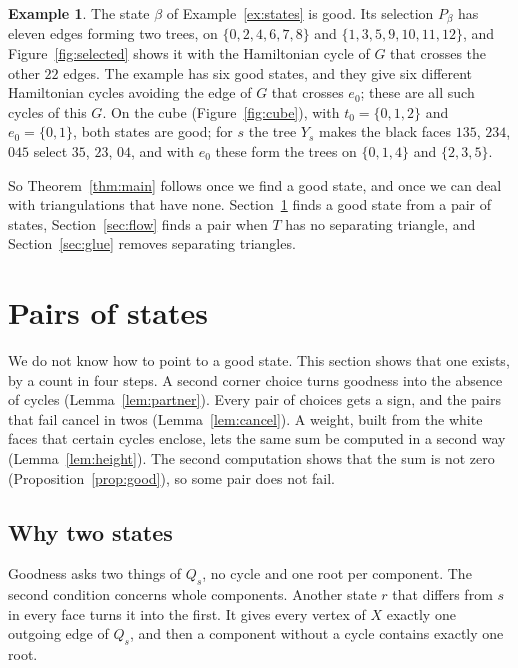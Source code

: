 \documentclass[10pt]{amsart}
\numberwithin{equation}{section}
\theoremstyle{definition}
\newtheorem{example}[equation]{Example}
\theoremstyle{remark}
\newcommand{\T}{T}
\begin{document}
\begin{example}\label{ex:recover}
The state $\beta$ of Example~\ref{ex:states} is good.
Its selection $P_\beta$ has eleven edges forming two trees, on $\{0,2,4,6,7,8\}$ and $\{1,3,5,9,10,11,12\}$, and Figure~\ref{fig:selected} shows it with the Hamiltonian cycle of $G$ that crosses the other $22$ edges.
The example has six good states, and they give six different Hamiltonian cycles avoiding the edge of $G$ that crosses $e_0$; these are all such cycles of this $G$.
On the cube (Figure~\ref{fig:cube}), with $t_0=\{0,1,2\}$ and $e_0=\{0,1\}$, both states are good; for $s$ the tree $Y_s$ makes the black faces $135$, $234$, $045$ select $35$, $23$, $04$, and with $e_0$ these form the trees on $\{0,1,4\}$ and $\{2,3,5\}$.
\end{example}

So Theorem~\ref{thm:main} follows once we find a good state, and once we can deal with triangulations that have none.
Section~\ref{sec:pairs} finds a good state from a pair of states, Section~\ref{sec:flow} finds a pair when $\T$ has no separating triangle, and Section~\ref{sec:glue} removes separating triangles.

\FloatBarrier
\section{Pairs of states}\label{sec:pairs}

We do not know how to point to a good state.
This section shows that one exists, by a count in four steps.
A second corner choice turns goodness into the absence of cycles (Lemma~\ref{lem:partner}).
Every pair of choices gets a sign, and the pairs that fail cancel in twos (Lemma~\ref{lem:cancel}).
A weight, built from the white faces that certain cycles enclose, lets the same sum be computed in a second way (Lemma~\ref{lem:height}).
The second computation shows that the sum is not zero (Proposition~\ref{prop:good}), so some pair does not fail.

\subsection*{Why two states}
Goodness asks two things of $Q_s$, no cycle and one root per component.
The second condition concerns whole components.
Another state $r$ that differs from $s$ in every face turns it into the first.
It gives every vertex of $X$ exactly one outgoing edge of $Q_s$, and then a component without a cycle contains exactly one root.
\end{document}
